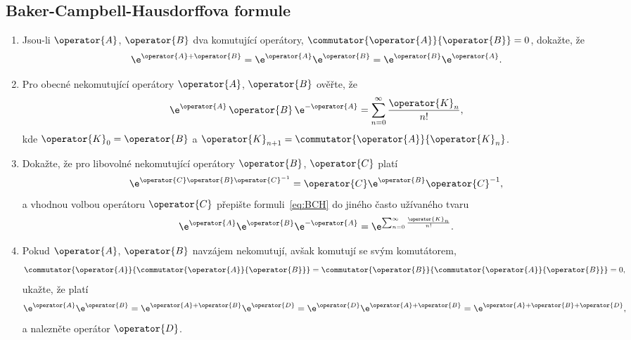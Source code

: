 \subsection{Baker-Campbell-Hausdorffova formule}
\begin{enumerate}
\item 
    Jsou-li $\operator{A}$, $\operator{B}$ dva komutující operátory, $\commutator{\operator{A}}{\operator{B}}=0$, dokažte, že
    \begin{equation}\label{eq:CommutatorExp}
        \e^{\operator{A}+\operator{B}}
            =\e^{\operator{A}}\e^{\operator{B}}
            =\e^{\operator{B}}\e^{\operator{A}}.
    \end{equation}

\item 
    Pro obecné nekomutující operátory $\operator{A}$, $\operator{B}$ ověřte, že
    \begin{equation}\label{eq:BCH}
        \e^{\operator{A}}\,\operator{B}\,\e^{-\operator{A}}
            =\sum_{n=0}^{\infty}\frac{\operator{K}_{n}}{n!},
    \end{equation}
    kde $\operator{K}_{0}=\operator{B}$ a $\operator{K}_{n+1}=\commutator{\operator{A}}{\operator{K}_{n}}$.

\item
    Dokažte, že pro libovolné nekomutující operátory $\operator{B}$, $\operator{C}$ platí
    \begin{equation}\label{eq:ExpExp}
        \e^{\operator{C}\operator{B}\operator{C}^{-1}}
            =\operator{C}\e^{\operator{B}}\operator{C}^{-1},
    \end{equation}
    a vhodnou volbou operátoru $\operator{C}$ přepište formuli~\eqref{eq:BCH} do jiného často užívaného tvaru
    \begin{equation}\label{eq:BCHExp}
        \e^{\operator{A}}\e^{\operator{B}}\e^{-\operator{A}}
            =\e^{\sum_{n=0}^{\infty}\frac{\operator{K}_{n}}{n!}}.
    \end{equation}		

    \item
    Pokud $\operator{A}$, $\operator{B}$ navzájem nekomutují, avšak komutují se svým komutátorem,
    \begin{equation}
        \commutator{\operator{A}}{\commutator{\operator{A}}{\operator{B}}}
            =\commutator{\operator{B}}{\commutator{\operator{A}}{\operator{B}}}
            =0,
    \end{equation}
    ukažte, že platí
    \begin{equation}
        \e^{\operator{A}}\e^{\operator{B}}
            =\e^{\operator{A}+\operator{B}}\e^{\operator{D}}
            =\e^{\operator{D}}\e^{\operator{A}+\operator{B}}
            =\e^{\operator{A}+\operator{B}+\operator{D}},
    \end{equation}
    a nalezněte operátor $\operator{D}$.				


\end{enumerate}
